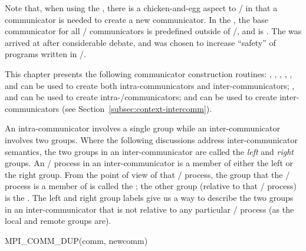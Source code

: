 \begin{rationale}
Note that, when using the \wpm{}, there is a chicken-and-egg aspect to \MPI/ in that a
communicator is needed to create a new communicator. In the \wpm{}, the base
communicator for all \MPI/ communicators is predefined outside of \MPI/,
and is . The \wpm{} was arrived at after
considerable debate, and was chosen to increase ``safety'' of programs
written in \MPI/.
\end{rationale}


This chapter presents
the following communicator construction routines: , ,
,\flushline %
, ,  \flushline %
and  can be used to create both intra-communicators and
inter-communicators; ,  and
can be used to create
intra\hyphen/communicators;  and 
can be used to create inter-communicators (see Section~\ref{subsec:context-intercomm}).

An intra-communicator involves a single group while an inter-communicator
involves two groups.
Where the following discussions address inter-communicator semantics,
the two groups in an inter-communicator are
called the \emph{left} and \emph{right} groups. An \MPI/ process in an
inter-communicator is a member of either the left or the right group. From the
point of view of that \MPI/ process, the
group that the \MPI/ process is a member of is called the ; the
other group (relative to that \MPI/ process) is the .
The left and right group labels give us a way to describe the two groups in
an inter-communicator that is not relative to any particular \MPI/ process (as the
local and remote groups are).

%
\begin{funcdef}{MPI\_COMM\_DUP}{(\mbox{comm}, \mbox{newcomm})}
\end{funcdef}
\label{subsec:context-intracomconst:comm-dup}

